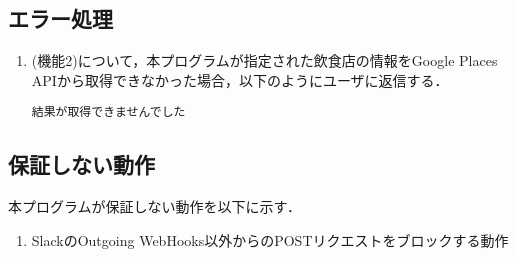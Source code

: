 \documentclass[12pt]{jsarticle}
\begin{document}
\subsection{エラー処理}
\begin{enumerate}
\item (機能2)について，本プログラムが指定された飲食店の情報をGoogle Places APIから取得できなかった場合，以下のようにユーザに返信する．
\begin{verbatim}
結果が取得できませんでした
\end{verbatim}
\end{enumerate}

\subsection{保証しない動作}
本プログラムが保証しない動作を以下に示す．

\begin{enumerate}
\item SlackのOutgoing WebHooks以外からのPOSTリクエストをブロックする動作
\end{enumerate}



\end{document}
